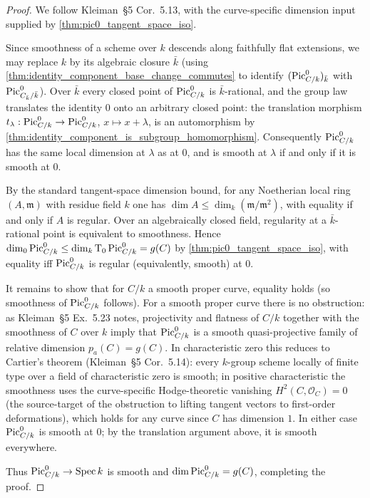 \begin{proof}
  We follow Kleiman~\S 5 Cor.~5.13, with the curve-specific dimension
  input supplied by \cref{thm:pic0_tangent_space_iso}.

  Since smoothness of a scheme over \(k\) descends along faithfully
  flat extensions, we may replace \(k\) by its algebraic closure
  \(\bar k\) (using \cref{thm:identity_component_base_change_commutes}
  to identify \((\operatorname{Pic}^0_{C/k})_{\bar k}\) with \(\operatorname{Pic}^0_{C_{\bar k}/\bar k}\)).
  Over \(\bar k\) every closed point of \(\operatorname{Pic}^0_{C/k}\) is
  \(\bar k\)-rational, and the group law translates the identity \(0\)
  onto an arbitrary closed point: the translation morphism
  \(t_\lambda : \operatorname{Pic}^0_{C/k} \to \operatorname{Pic}^0_{C/k}\), \(x \mapsto x +
  \lambda\), is an automorphism by
  \cref{thm:identity_component_is_subgroup_homomorphism}. Consequently
  \(\operatorname{Pic}^0_{C/k}\) has the same local dimension at \(\lambda\) as at
  \(0\), and is smooth at \(\lambda\) if and only if it is smooth at
  \(0\).

  By the standard tangent-space dimension bound, for any Noetherian
  local ring \((A, \mathfrak{m})\) with residue field \(k\) one has
  \(\dim A \le \dim_k (\mathfrak{m}/\mathfrak{m}^2)\), with equality
  if and only if \(A\) is regular. Over an algebraically closed field,
  regularity at a \(\bar k\)-rational point is equivalent to
  smoothness. Hence
  \(
    \dim_0 \operatorname{Pic}^0_{C/k} \le \dim_k \textup T_0 \operatorname{Pic}^0_{C/k} = g(C)
  \)
  by \cref{thm:pic0_tangent_space_iso}, with equality iff
  \(\operatorname{Pic}^0_{C/k}\) is regular (equivalently, smooth) at \(0\).

  It remains to show that for \(C/k\) a smooth proper curve, equality
  holds (so smoothness of \(\operatorname{Pic}^0_{C/k}\) follows). For a smooth
  proper curve there is no obstruction: as Kleiman~\S 5 Ex.~5.23
  notes, projectivity and flatness of \(C/k\) together with the
  smoothness of \(C\) over \(k\) imply that \(\operatorname{Pic}^0_{C/k}\) is a
  smooth quasi-projective family of relative dimension \(p_a(C) =
  g(C)\). In characteristic zero this reduces to Cartier's theorem
  (Kleiman~\S 5 Cor.~5.14): every \(k\)-group scheme locally of
  finite type over a field of characteristic zero is smooth; in
  positive characteristic the smoothness uses the curve-specific
  Hodge-theoretic vanishing
  \(H^2(C, \mathcal{O}_C) = 0\) (the source-target of the obstruction
  to lifting tangent vectors to first-order deformations), which holds
  for any curve since \(C\) has dimension \(1\). In either case
  \(\operatorname{Pic}^0_{C/k}\) is smooth at \(0\); by the translation argument
  above, it is smooth everywhere.

  Thus \(\operatorname{Pic}^0_{C/k} \to \operatorname{Spec} k\) is smooth and
  \(\dim \operatorname{Pic}^0_{C/k} = g(C)\), completing the proof.
\end{proof}

